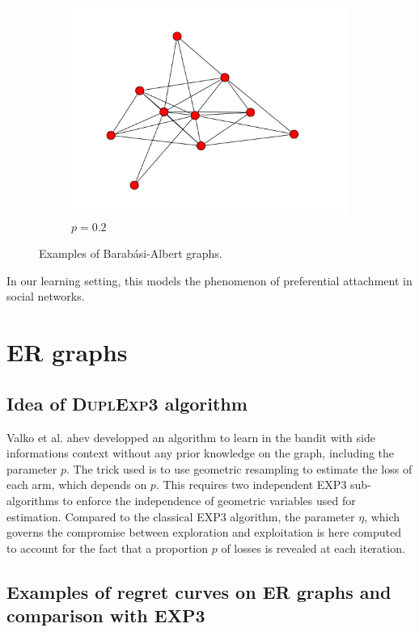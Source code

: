 \documentclass[10pt,a4paper]{scrartcl}
\begin{document}
\begin{figure}[H]
\begin{center}
\begin{subfigure}[b]{0.3\textwidth}
                \includegraphics[width=\textwidth]{figures/BA_graph_5.pdf}
                \caption{$p=0.2$}
        \end{subfigure}
\end{center}
\caption{Examples of Barabási-Albert graphs.}
 \label{ba_ex}
\end{figure}


In our learning setting, this models the phenomenon of preferential attachment in social networks.

\section{ER graphs}
\subsection{Idea of \textsc{DuplExp3} algorithm}
Valko et al. ahev developped an algorithm to learn in the bandit with side informations context without any prior knowledge on the graph, including the parameter $p$. The trick used is to use geometric resampling to estimate the loss of each arm, which depends on $p$. This requires two independent EXP3 sub-algorithms to enforce the independence of geometric variables used for estimation. Compared to the classical EXP3 algorithm, the parameter $\eta$, which governs the compromise between exploration and exploitation is here computed to account for the fact that a proportion $p$ of losses is revealed at each iteration.


\subsection{Examples of regret curves on ER graphs and comparison with EXP3}
\end{document}
